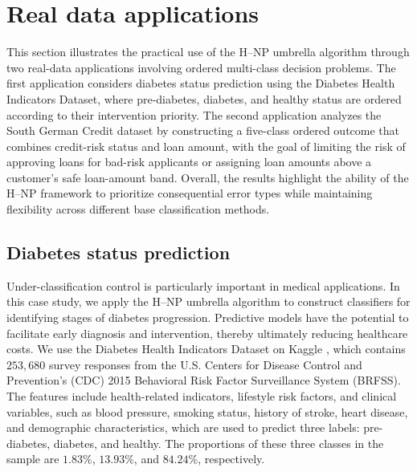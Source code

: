 



\section{Real data applications}\label{sec:real
_data}



This section illustrates the practical use of the H--NP umbrella algorithm through two real-data applications involving ordered multi-class decision problems. The first application considers diabetes status prediction using the Diabetes Health Indicators Dataset, where pre-diabetes, diabetes, and healthy status are ordered according to their intervention priority. The second application analyzes the South German Credit dataset by constructing a five-class ordered outcome that combines credit-risk status and loan amount, with the goal of limiting the risk of approving loans for bad-risk applicants or assigning loan amounts above a customer's safe loan-amount band. Overall, the results highlight the ability of the H--NP framework to prioritize consequential error types while maintaining flexibility across different base classification methods.



\subsection{Diabetes status prediction}



Under-classification control is particularly important in medical applications. In this case study, we apply the H--NP umbrella algorithm to construct classifiers for identifying stages of diabetes progression. Predictive models \citep{xie2019building} have the potential to facilitate early diagnosis and intervention, thereby ultimately reducing healthcare costs. We use the Diabetes Health Indicators Dataset on Kaggle \citep{CDC2015}, which contains \(253{,}680\) survey responses from the U.S. Centers for Disease Control and Prevention's (CDC) 2015 Behavioral Risk Factor Surveillance System (BRFSS). The features include health-related indicators, lifestyle risk factors, and clinical variables, such as blood pressure, smoking status, history of stroke, heart disease, and demographic characteristics, which are used to predict three labels: pre-diabetes, diabetes, and healthy. The proportions of these three classes in the sample are \(1.83\%\), \(13.93\%\), and \(84.24\%\), respectively.

